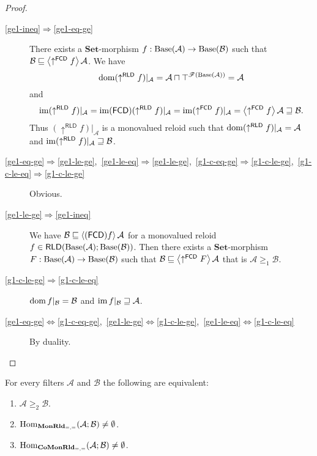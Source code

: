 \begin{proof}
~
\begin{description}
\item [{\ref{ge1-ineq}$\Rightarrow$\ref{ge1-eq-ge}}] There exists a
$\mathbf{Set}$-morphism $f:\operatorname{Base}(\mathcal{A})\rightarrow\operatorname{Base}(\mathcal{B})$
such that $\mathcal{B}\sqsubseteq\left\langle \uparrow^{\mathsf{FCD}}f\right\rangle\mathcal{A}$.
We have
\[
\operatorname{dom}(\uparrow^{\mathsf{RLD}}f)|_{\mathcal{A}}=\mathcal{A}\sqcap\top^{\mathscr{F}(\operatorname{Base}(\mathcal{A}))}=\mathcal{A}
\]
and
\[
\operatorname{im}(\uparrow^{\mathsf{RLD}}f)|_{\mathcal{A}}=\operatorname{im}(\mathsf{FCD})(\uparrow^{\mathsf{RLD}}f)|_{\mathcal{A}}=\operatorname{im}(\uparrow^{\mathsf{FCD}}f)|_{\mathcal{A}}=\left\langle \uparrow^{\mathsf{FCD}}f\right\rangle\mathcal{A}\sqsupseteq\mathcal{B}.
\]
Thus $(\uparrow^{\mathsf{RLD}}f)|_{\mathcal{A}}$ is a monovalued
reloid such that $\operatorname{dom}(\uparrow^{\mathsf{RLD}}f)|_{\mathcal{A}}=\mathcal{A}$
and $\operatorname{im}(\uparrow^{\mathsf{RLD}}f)|_{\mathcal{A}}\sqsupseteq\mathcal{B}$.
\item [{\ref{ge1-eq-ge}$\Rightarrow$\ref{ge1-le-ge},~\ref{ge1-le-eq}$\Rightarrow$\ref{ge1-le-ge},~\ref{g1-c-eq-ge}$\Rightarrow$\ref{g1-c-le-ge},~\ref{g1-c-le-eq}$\Rightarrow$\ref{g1-c-le-ge}}] Obvious.
\item [{\ref{ge1-le-ge}$\Rightarrow$\ref{ge1-ineq}}] We have $\mathcal{B}\sqsubseteq\left\langle (\mathsf{FCD}) f\right\rangle\mathcal{A}$
for a monovalued reloid $f\in\mathsf{RLD}(\operatorname{Base}(\mathcal{A});\operatorname{Base}(\mathcal{B}))$.
Then there exists a $\mathbf{Set}$-morphism $F:\operatorname{Base}(\mathcal{A})\rightarrow\operatorname{Base}(\mathcal{B})$
such that $\mathcal{B}\sqsubseteq\left\langle \uparrow^{\mathsf{FCD}}F\right\rangle\mathcal{A}$
that is $\mathcal{A}\ge_{1}\mathcal{B}$.
\item [{\ref{g1-c-le-ge}$\Rightarrow$\ref{g1-c-le-eq}}] $\operatorname{dom} f|_{\mathcal{B}}=\mathcal{B}$
and $\operatorname{im} f|_{\mathcal{B}}\sqsupseteq\mathcal{A}$.
\item [{\ref{ge1-eq-ge}$\Leftrightarrow$\ref{g1-c-eq-ge},~\ref{ge1-le-ge}$\Leftrightarrow$\ref{g1-c-le-ge},~\ref{ge1-le-eq}$\Leftrightarrow$\ref{g1-c-le-eq}}] By
duality.
\end{description}
\end{proof}
\begin{thm}
For every filters $\mathcal{A}$ and $\mathcal{B}$ the following
are equivalent:
\begin{enumerate}
\item \label{ge2-in}$\mathcal{A}\ge_{2}\mathcal{B}$.
\item \label{ge2-mon}$\operatorname{Hom}_{\mathbf{MonRld}_{=,=}}(\mathcal{A};\mathcal{B})\ne\emptyset$.
\item \label{ge2-comon}$\operatorname{Hom}_{\mathbf{CoMonRld}_{=,=}}(\mathcal{A};\mathcal{B})\ne\emptyset$.
\end{enumerate}
\end{thm}

